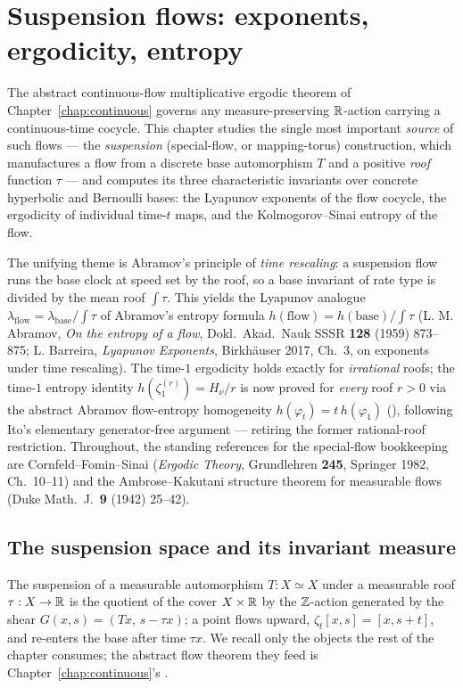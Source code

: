 \chapter{Suspension flows: exponents, ergodicity, entropy}
\label{ch:suspension}

The abstract continuous-flow multiplicative ergodic theorem of
Chapter~\ref{chap:continuous} governs any measure-preserving $\mathbb{R}$-action carrying a
continuous-time cocycle. This chapter studies the single most important \emph{source} of
such flows --- the \emph{suspension} (special-flow, or mapping-torus) construction, which
manufactures a flow from a discrete base automorphism $T$ and a positive \emph{roof}
function $\tau$ --- and computes its three characteristic invariants over concrete
hyperbolic and Bernoulli bases: the Lyapunov exponents of the flow cocycle, the ergodicity
of individual time-$t$ maps, and the Kolmogorov--Sinai entropy of the flow.

The unifying theme is Abramov's principle of \emph{time rescaling}: a suspension flow runs
the base clock at speed set by the roof, so a base invariant of rate type is divided by the
mean roof $\int\tau$. This yields the Lyapunov analogue
$\lambda_{\mathrm{flow}} = \lambda_{\mathrm{base}}/\int\tau$ of Abramov's entropy formula
$h(\text{flow}) = h(\text{base})/\int\tau$ (L. M. Abramov, \emph{On the entropy of a flow},
Dokl.\ Akad.\ Nauk SSSR \textbf{128} (1959) 873--875; L. Barreira, \emph{Lyapunov Exponents},
Birkh\"auser 2017, Ch.~3, on exponents under time rescaling). The time-$1$ ergodicity holds
exactly for \emph{irrational} roofs; the time-$1$ entropy identity $h(\zeta^{(r)}_1) = H_\nu/r$
is now proved for \emph{every} roof $r > 0$ via the abstract Abramov flow-entropy homogeneity
$h(\varphi_t) = t\,h(\varphi_1)$ (), following Ito's elementary
generator-free argument --- retiring the former rational-roof restriction.
Throughout, the standing references for the special-flow bookkeeping are Cornfeld--Fomin--Sinai
(\emph{Ergodic Theory}, Grundlehren \textbf{245}, Springer 1982, Ch.~10--11) and the
Ambrose--Kakutani structure theorem for measurable flows (Duke Math.\ J.\ \textbf{9} (1942)
25--42).

\section{The suspension space and its invariant measure}

The suspension of a measurable automorphism $T : X \simeq X$ under a measurable roof
$\tau : X \to \mathbb{R}$ is the quotient of the cover $X \times \mathbb{R}$ by the $\mathbb{Z}$-action generated by
the shear $G(x, s) = (Tx,\, s - \tau x)$; a point flows upward, $\zeta_t[x, s] = [x, s + t]$,
and re-enters the base after time $\tau x$. We recall only the objects the rest of the chapter
consumes; the abstract flow theorem they feed is Chapter~\ref{chap:continuous}'s
.

